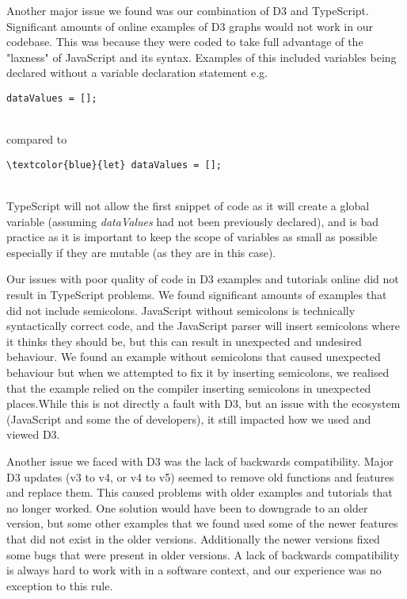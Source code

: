 \documentclass[10pt, journal]{IEEEtran}
\begin{document}
Another major issue we found was our combination of D3 and TypeScript. Significant amounts of online examples of D3 graphs would not work in our codebase. This was because they were coded to take full advantage of the "laxness" of JavaScript and its syntax. Examples of this included variables being declared without a variable declaration statement \cite{badcode} e.g.
\begin{verbatim}
dataValues = [];
\end{verbatim}
~\\
compared to 
~\\
\begin{Verbatim}[commandchars=\\\{\}]
\textcolor{blue}{let} dataValues = [];
\end{Verbatim}
~\\
TypeScript will not allow the first snippet of code as it will create a global variable (assuming \textit{dataValues} had not been previously declared), and is bad practice as it is important to keep the scope of variables as small as possible especially if they are mutable (as they are in this case). 

Our issues with poor quality of code in D3 examples and tutorials online did not result in TypeScript problems. We found significant amounts of examples that did not include semicolons. JavaScript without semicolons is technically syntactically correct code, and the JavaScript parser will insert semicolons where it thinks they should be, but this can result in unexpected and undesired behaviour. We found an example without semicolons that caused unexpected behaviour but when we attempted to fix it by inserting semicolons, we realised that the example relied on the compiler inserting semicolons in unexpected places.While this is not directly a fault with D3, but an issue with the ecosystem (JavaScript and some the of developers), it still impacted how we used and viewed D3. 

Another issue we faced with D3 was the lack of backwards compatibility. Major D3 updates (v3 to v4, or v4 to v5) seemed to remove old functions and features and replace them. This caused problems with older examples and tutorials that no longer worked. One solution would have been to downgrade to an older version, but some other examples that we found used some of the newer features that did not exist in the older versions. Additionally the newer versions fixed some bugs that were present in older versions. A lack of backwards compatibility is always hard to work with in a software context, and our experience was no exception to this rule.
\end{document}
